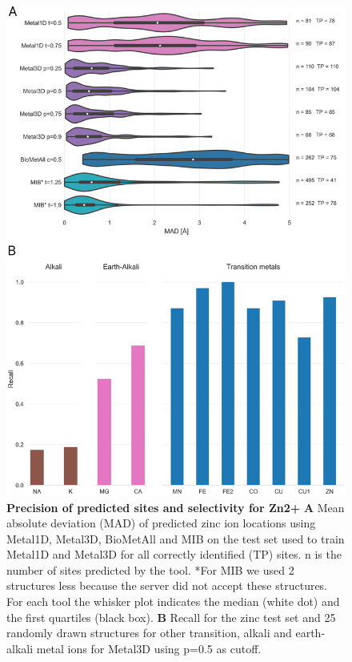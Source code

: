 \documentclass[  ASAPversion,
  ,
  9pt]{elife}
\begin{document}
\begin{figure}
\hypertarget{fig:selectivity-mad}{%
\centering
\includegraphics{images/Figure3_selectivity_mad.png}
\caption{\textbf{Precision of predicted sites and selectivity for Zn2+} \textbf{A} Mean absolute deviation (MAD) of predicted zinc ion locations using Metal1D, Metal3D, BioMetAll and MIB on the test set used to train Metal1D and Metal3D for all correctly identified (TP) sites. n is the number of sites predicted by the tool. *For MIB we used 2 structures less because the server did not accept these structures. For each tool the whisker plot indicates the median (white dot) and the first quartiles (black box). \textbf{B} Recall for the zinc test set and 25 randomly drawn structures for other transition, alkali and earth-alkali metal ions for Metal3D using p=0.5 as cutoff.}\label{fig:selectivity-mad}
}
\end{figure}
\end{document}

